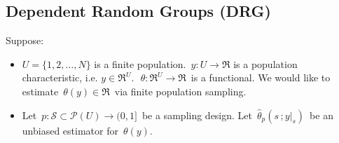 

\subsection{Dependent Random Groups (DRG)}

\vskip 0.2cm
Suppose:
\begin{itemize}
\item
	$U = \{1,2,\ldots,N\}$\; is a finite population.
	\,$y : U \longrightarrow \Re$\; is a population characteristic, i.e. \;$y \in \Re^{U}$.\,
	\,$\theta : \Re^{U} \longrightarrow \Re$\, is a functional.
	We would like to estimate \,$\theta(y) \in \Re$\, via finite population sampling.
\item
	Let \,$p : \mathcal{S} \subset \mathcal{P}(U) \longrightarrow (0,1]$\, be a sampling design.
	Let \,$\widehat{\theta}_{p}(s\,;y\vert_{s})$\, be an unbiased estimator for \,$\theta(y)$.
\end{itemize}

